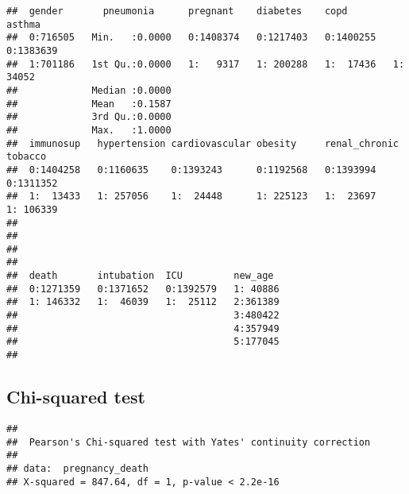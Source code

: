 \documentclass[
]{article}
\newenvironment{Shaded}{\begin{snugshade}}{\end{snugshade}}
\newcommand{\CommentTok}[1]{\textcolor[rgb]{0.56,0.35,0.01}{\textit{#1}}}
\newcommand{\FunctionTok}[1]{\textcolor[rgb]{0.00,0.00,0.00}{#1}}
\newcommand{\NormalTok}[1]{#1}
\newcommand{\OtherTok}[1]{\textcolor[rgb]{0.56,0.35,0.01}{#1}}
\newcommand{\SpecialCharTok}[1]{\textcolor[rgb]{0.00,0.00,0.00}{#1}}
\begin{document}
\begin{verbatim}
##  gender       pneumonia      pregnant    diabetes    copd        asthma     
##  0:716505   Min.   :0.0000   0:1408374   0:1217403   0:1400255   0:1383639  
##  1:701186   1st Qu.:0.0000   1:   9317   1: 200288   1:  17436   1:  34052  
##             Median :0.0000                                                  
##             Mean   :0.1587                                                  
##             3rd Qu.:0.0000                                                  
##             Max.   :1.0000                                                  
##  immunosup   hypertension cardiovascular obesity     renal_chronic tobacco    
##  0:1404258   0:1160635    0:1393243      0:1192568   0:1393994     0:1311352  
##  1:  13433   1: 257056    1:  24448      1: 225123   1:  23697     1: 106339  
##                                                                               
##                                                                               
##                                                                               
##                                                                               
##  death       intubation  ICU         new_age   
##  0:1271359   0:1371652   0:1392579   1: 40886  
##  1: 146332   1:  46039   1:  25112   2:361389  
##                                      3:480422  
##                                      4:357949  
##                                      5:177045  
## 
\end{verbatim}

\hypertarget{chi-squared-test}{%
\subsection{Chi-squared test}\label{chi-squared-test}}

\begin{Shaded}
\end{Shaded}

\begin{verbatim}
## 
##  Pearson's Chi-squared test with Yates' continuity correction
## 
## data:  pregnancy_death
## X-squared = 847.64, df = 1, p-value < 2.2e-16
\end{verbatim}
\end{document}

